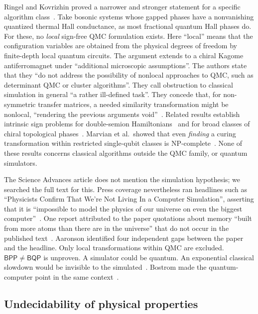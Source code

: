 Ringel and Kovrizhin proved a narrower and stronger statement for a specific
algorithm class~\cite{Ringel2017quantized}. Take bosonic systems whose gapped
phases have a nonvanishing quantized thermal Hall conductance, as most
fractional quantum Hall phases do. For these, no \emph{local} sign-free QMC
formulation exists. Here ``local'' means that the configuration variables are
obtained from the physical degrees of freedom by finite-depth local quantum
circuits. The argument extends to a chiral Kagome antiferromagnet under
``additional microscopic assumptions''. The authors state that they ``do not
address the possibility of nonlocal approaches to QMC, such as determinant QMC
or cluster algorithms''. They call obstruction to classical simulation in
general ``a rather ill-defined task''. They concede that, for non-symmetric
transfer matrices, a needed similarity transformation might be nonlocal,
``rendering the previous arguments void''~\cite{Ringel2017quantized}.
Related results establish intrinsic sign problems for double-semion
Hamiltonians~\cite{Hastings2016how} and for broad classes of chiral
topological phases~\cite{Smith2020intrinsic,Golan2020intrinsic}. Marvian et al.\ showed
that even \emph{finding} a curing transformation within restricted
single-qubit classes is NP-complete~\cite{Marvian2019on}. None of these
results concerns classical algorithms outside the QMC family, or quantum
simulators.

The Science Advances article does not mention the simulation hypothesis; we
searched the full text for this. Press coverage nevertheless ran headlines
such as ``Physicists Confirm That We're Not Living In a Computer Simulation'',
asserting that it is ``impossible to model the physics of our universe on even
the biggest computer''~\cite{Eck2017physicists}. One report attributed to the
paper quotations about memory ``built from more atoms than there are in the
universe'' that do not occur in the published text~\cite{UPI2017were}.
Aaronson identified four independent gaps between the paper and the headline.
Only local transformations within QMC are excluded. $\mathsf{BPP}\neq\mathsf{BQP}$
is unproven. A simulator could be quantum. An exponential classical slowdown
would be invisible to the simulated~\cite{Aaronson2017because}. Bostrom made
the quantum-computer point in the same context~\cite{Bostrom2025simulation}.

\subsection{Undecidability of physical properties}
\label{sec:complexity:undecidability}

